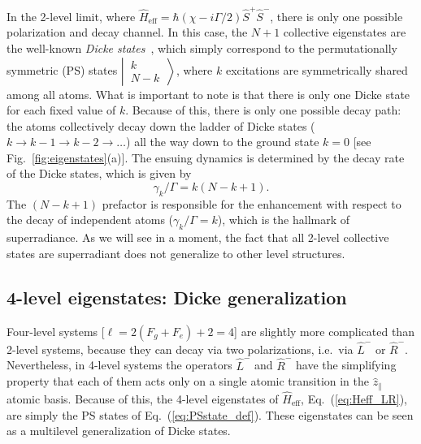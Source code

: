 \documentclass[aps,prx,superscriptaddress,twocolumn,notitlepage,nofootinbib,longbibliography]{revtex4-2}
\newcommand{\quv}{\hat{z}}
\begin{document}
In the 2-level limit, where $\hat{H}_\text{eff} =\hbar (\chi-i\Gamma/2) \hat{S}^+ \hat{S}^-$, there is only one possible polarization and decay channel.
In this case, the $N+1$ collective eigenstates are the well-known \emph{Dicke states}~\cite{DickePR93,ArecchiPRA1972}, which simply correspond to the permutationally symmetric (PS) states $\left|\, \begin{smallmatrix} k \\ N-k \end{smallmatrix} \,\right\rangle$, where $k$ excitations are symmetrically shared among all atoms.
What is important to note is that there is only one Dicke state for each fixed value of $k$. Because of this, there is only one possible decay path: the atoms collectively decay down the ladder of Dicke states ($k\rightarrow k-1 \rightarrow k-2 \rightarrow \ldots$) all the way down to the ground state $k=0$ [see Fig.~\ref{fig:eigenstates}(a)].
The ensuing dynamics is determined by the decay rate of the Dicke states, which is given by
\begin{equation}
	\gamma_k/\Gamma = k(N-k+1).
\label{eq:decay_2level}
\end{equation}
The $(N-k+1)$ prefactor is responsible for the  enhancement with respect to the decay of independent atoms ($\gamma_k/\Gamma = k$), which is the hallmark of superradiance.
As we will see in a moment, the fact that all 2-level collective states are superradiant does not generalize to other level structures.





\subsection{4-level eigenstates: Dicke generalization\label{ssec:eigenstates_4l}}

Four-level systems [$\ell = 2(F_g+F_e)+2=4$] are slightly more complicated than 2-level systems, because they can decay via two polarizations, i.e.~via $\hat{L}^-$ or $\hat{R}^-$.
Nevertheless, in 4-level systems the operators $\hat{L}^-$ and $\hat{R}^-$ have the simplifying property that each of them acts only on a single atomic transition in the $\quv_\parallel$ atomic basis.
Because of this, the 4-level eigenstates of $\hat{H}_\text{eff}$, Eq.~(\ref{eq:Heff_LR}), are simply the PS states of Eq.~(\ref{eq:PSstate_def}).
These eigenstates can be seen as a multilevel generalization of Dicke states.
\end{document}
